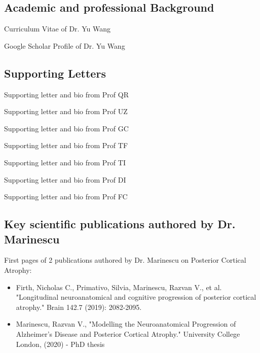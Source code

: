 \documentclass[11pt]{article}
\begin{document}
\begin{thebibliography}{9}

\subsection*{Academic and professional Background}

Curriculum Vitae of Dr. Yu Wang


Google Scholar Profile of Dr. Yu Wang 


\subsection*{Supporting Letters}

Supporting letter and bio from Prof QR

Supporting letter and bio from Prof UZ

Supporting letter and bio from Prof GC

Supporting letter and bio from Prof TF

Supporting letter and bio from Prof TI

Supporting letter and bio from Prof DI

Supporting letter and bio from Prof FC

\subsection*{Key scientific publications authored by Dr. Marinescu}



First pages of 2 publications authored by Dr. Marinescu on Posterior Cortical Atrophy:
\begin{itemize}
 \item Firth, Nicholas C., Primativo, Silvia, Marinescu, Razvan V., et al. "Longitudinal neuroanatomical and cognitive progression of posterior cortical atrophy." Brain 142.7 (2019): 2082-2095.
 \item Marinescu, Razvan V., "Modelling the Neuroanatomical Progression of Alzheimer's Disease and Posterior Cortical Atrophy." University College London, (2020) - PhD thesis
\end{itemize}





\end{thebibliography}
\end{document}
